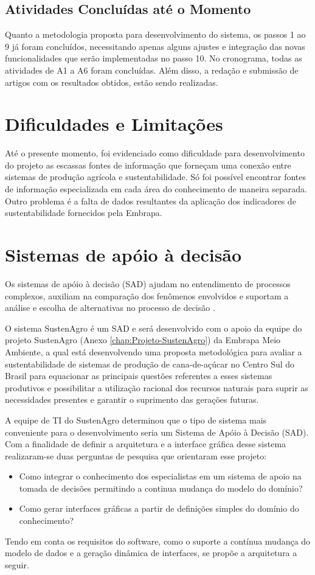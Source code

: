 \subsection{Atividades Concluídas até o Momento}

Quanto a metodologia proposta para desenvolvimento do sistema, os
passos 1 ao 9 já foram concluídos, necessitando apenas alguns ajustes
e integração das novas funcionalidades que serão implementadas no
passo 10. No cronograma, todas as atividades de A1 a A6 foram concluídas.
Além disso, a redação e submissão de artigos com os resultados obtidos,
estão sendo realizadas.

\section{Dificuldades e Limitações}

Até o presente momento, foi evidenciado como dificuldade para desenvolvimento
do projeto as escassas fontes de informação que forneçam uma conexão
entre sistemas de produção agrícola e sustentabilidade. Só foi possível
encontrar fontes de informação especializada em cada área do conhecimento
de maneira separada. Outro problema é a falta de dados resultantes
da aplicação dos indicadores de sustentabilidade fornecidos pela Embrapa.

\section{Sistemas de apóio à decisão}

Os sistemas de apóio à decisão (SAD) ajudam no entendimento de processos
complexos, auxiliam na comparação dos fenômenos envolvidos e suportam
a análise e escolha de alternativas no processo de decisão \citep{heinzle2010semantica}.

O sistema SustenAgro é um SAD e será desenvolvido com o apoio da equipe
do projeto SustenAgro (Anexo \ref{chap:Projeto-SustenAgro}) da Embrapa
Meio Ambiente, a qual está desenvolvendo uma proposta metodológica
para avaliar a sustentabilidade de sistemas de produção de cana-de-açúcar
no Centro Sul do Brasil para equacionar as principais questões referentes
a esses sistemas produtivos e possibilitar a utilização racional dos
recursos naturais para suprir as necessidades presentes e garantir
o suprimento das gerações futuras.

A equipe de TI do SustenAgro determinou que o tipo de sistema mais
conveniente para o desenvolvimento seria um Sistema de Apóio à Decisão
(SAD). Com a finalidade de definir a arquitetura e a interface gráfica
desse sistema realizaram-se duas perguntas de pesquisa que orientaram
esse projeto:
\begin{itemize}
\item Como integrar o conhecimento dos especialistas em um sistema de apoio
na tomada de decisões permitindo a continua mudança do modelo do domínio?
\item Como gerar interfaces gráficas a partir de definições simples do domínio
do conhecimento?
\end{itemize}
Tendo em conta os requisitos do software, como o suporte a contínua
mudança do modelo de dados e a geração dinâmica de interfaces, se
propõe a arquitetura a seguir.

